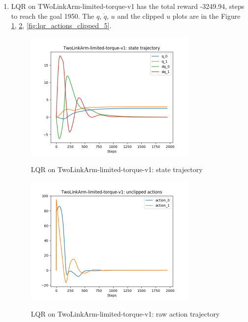 \documentclass[12pt]{article}
\begin{document}
\begin{tcolorbox}
\begin{enumerate}
	\item
	LQR on TWoLinkArm-limited-torque-v1 has the total reward -3249.94, steps to reach the goal 1950. The $q$, $\dot{q}$, $u$ and the clipped $u$ plots are in the Figure \ref{fig:lqr_states_5}, \ref{fig:lqr_actions_5}, \ref{fig:lqr_actions_clipped_5}. 
	
	\begin{figure}[H]
	\caption{LQR on TwoLinkArm-limited-torque-v1: state trajectory}	
	\centering
	\includegraphics[width=0.8\textwidth]{lqr_5_states.png}
	\label{fig:lqr_states_5}
	\end{figure}
	
	\begin{figure}[H]
	\caption{LQR on TwoLinkArm-limited-torque-v1: raw action trajectory}
	\centering
	\includegraphics[width=0.8\textwidth]{lqr_5_raw_acts.png}
	\label{fig:lqr_actions_5}	
	\end{figure}
	

\end{enumerate}
\end{tcolorbox}
\end{document}
